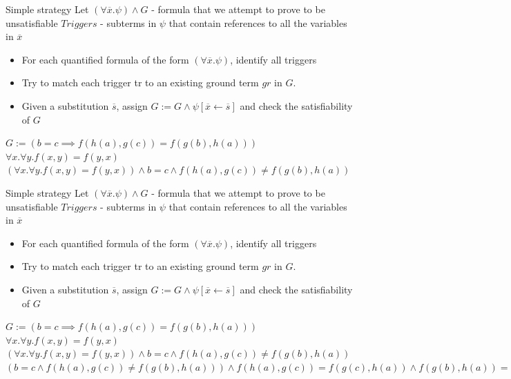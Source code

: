 \documentclass{beamer}
\begin{document}
\begin{frame}{Simple strategy}
Let $(\forall\overline{x}.\psi) \wedge G$ - formula that we attempt to prove to be unsatisfiable\newline
$Triggers$ - subterms in $\psi$ that contain references to all the variables in $\overline{x}$\newline
\begin{itemize}
\item For each quantified formula of the form $(\forall\overline{x}.\psi)$, identify all triggers
\item Try to match each trigger tr to an existing ground term $gr$ in $G$.
\item Given a substitution $\overline{s}$, assign $G := G \wedge \psi[\overline{x}\leftarrow\overline{s}]$ and check the satisfiability of
$G$
\end{itemize}
$G := (b = c \implies f(h(a), g(c)) = f(g(b), h(a)))$\newline
$\forall x.\forall y.f(x, y) = f(y, x)$\newline
$(\forall x.\forall y.f(x, y) = f(y, x)) \wedge b = c \wedge f(h(a), g(c)) \neq f(g(b), h(a))$\newline
\end{frame}

\begin{frame}{Simple strategy}
Let $(\forall\overline{x}.\psi) \wedge G$ - formula that we attempt to prove to be unsatisfiable\newline
$Triggers$ - subterms in $\psi$ that contain references to all the variables in $\overline{x}$\newline
\begin{itemize}
\item For each quantified formula of the form $(\forall\overline{x}.\psi)$, identify all triggers
\item Try to match each trigger tr to an existing ground term $gr$ in $G$.
\item Given a substitution $\overline{s}$, assign $G := G \wedge \psi[\overline{x}\leftarrow\overline{s}]$ and check the satisfiability of
$G$
\end{itemize}
$G := (b = c \implies f(h(a), g(c)) = f(g(b), h(a)))$\newline
$\forall x.\forall y.f(x, y) = f(y, x)$\newline
$(\forall x.\forall y.f(x, y) = f(y, x)) \wedge b = c \wedge f(h(a), g(c)) \neq f(g(b), h(a))$\newline
$(b = c \wedge f(h(a), g(c)) \neq f(g(b), h(a))) \wedge f(h(a), g(c)) = f(g(c), h(a)) \wedge f(g(b), h(a)) = f(h(a), g(b))$\newline
\end{frame}
\end{document}
